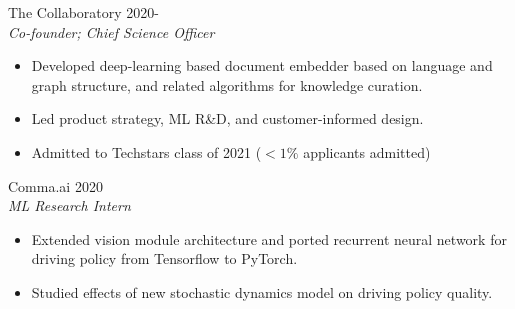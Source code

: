 \documentclass[margin]{res}
\begin{document}
\begin{resume}
                The Collaboratory \hfill 2020- \\
                 {\sl Co-founder; Chief Science Officer}
                 \begin{itemize}  \itemsep -2pt %
                 \item Developed deep-learning based document embedder
                   based on language and graph structure, and related algorithms
                   for knowledge curation.
                 \item Led product strategy, ML R\&D,
                   and customer-informed design.
                 \item Admitted to Techstars class of 2021 ($<1\%$ applicants admitted)
                 \end{itemize}

                 Comma.ai \hfill            2020 \\
		{\sl ML Research Intern}
                 \begin{itemize}  \itemsep -2pt %
                 \item Extended	vision module architecture and ported recurrent
                   neural network for driving policy from Tensorflow to PyTorch.
                 \item Studied effects of new stochastic dynamics model on driving
                   policy quality.
                 \end{itemize}


\end{resume}
\end{document}
